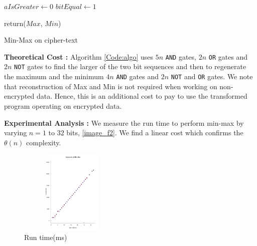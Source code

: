 \documentclass{acm_proc_article-sp}
\begin{document}

\linesnumbered

\begin{algorithm}[H]

\SetVline



 $aIsGreater \leftarrow 0$\;
 $bitEqual \leftarrow 1$\;
	


return($Max$, $Min$)

 \caption{Min-Max on cipher-text \label{Code:algo}}


\end{algorithm}


\textbf{Theoretical Cost :} Algorithm \autoref{Code:algo} uses $5n$ \texttt{AND} gates, $2n$ \texttt{OR} gates and $2n$ \texttt{NOT} gates to find the larger of the two bit sequences and then to regenerate the maximum and the minimum $4n$ \texttt{AND} gates and $2n$ \texttt{NOT} and \texttt{OR} gates. We note that reconstruction of Max and  Min is not required when working on non-encrypted data. Hence, this is an additional cost to pay to use the transformed program operating on encrypted data.  

\textbf{Experimental Analysis :} We measure the run time to perform min-max by varying $n=1$ to $32$ bits, \autoref{image_f2}. We find a linear cost which confirms the $\theta(n)$ complexity.

\begin{figure}[!h] %
\centering
\includegraphics[width=5cm,height=4cm]{f2.pdf} 
\caption{Run time(ms)} 
\label{image_f2} %
\end{figure}
\end{document}
